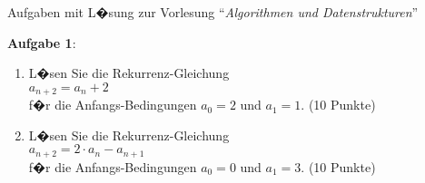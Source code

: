 \documentclass{article}
\begin{document}
\noindent
{\large Aufgaben mit L�sung zur Vorlesung  ``{\sl Algorithmen und Datenstrukturen}''}
\vspace{0.5cm}


\noindent
\textbf{Aufgabe 1}:
\begin{enumerate}
\item L�sen Sie die Rekurrenz-Gleichung \\[0.2cm]
      \hspace*{1.3cm} $a_{n+2} = a_n + 2$ \\[0.2cm]
      f�r die Anfangs-Bedingungen $a_0 = 2$ und $a_1 = 1$.
      \hspace*{\fill} (10 Punkte)
\item L�sen Sie die Rekurrenz-Gleichung \\[0.2cm]
      \hspace*{1.3cm} $a_{n+2} = 2 \cdot a_n - a_{n+1}$ \\[0.2cm]
      f�r die Anfangs-Bedingungen $a_0 = 0$ und $a_1 = 3$.
      \hspace*{\fill} (10 Punkte)
\end{enumerate}
\vspace{0.1cm}
\end{document}
